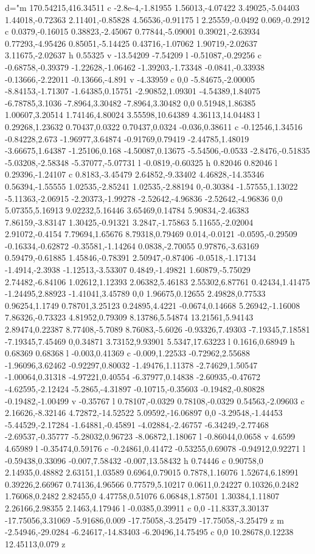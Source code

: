                 d="m 170.54215,416.34511 c -2.8e-4,-1.81955 1.56013,-4.07422 3.49025,-5.04403 1.44018,-0.72363 2.11401,-0.85828 4.56536,-0.91175 l 2.25559,-0.0492 0.069,-0.2912 c 0.0379,-0.16015 0.38823,-2.45067 0.77844,-5.09001 0.39021,-2.63934 0.77293,-4.95426 0.85051,-5.14425 0.43716,-1.07062 1.90719,-2.02637 3.11675,-2.02637 h 0.55325 v -13.54209 -7.54209 l -0.51087,-0.29256 c -0.68758,-0.39379 -1.22628,-1.06462 -1.39203,-1.73348 -0.0841,-0.33938 -0.13666,-2.22011 -0.13666,-4.891 v -4.33959 c 0,0 -5.84675,-2.00005 -8.84153,-1.71307 -1.64385,0.15751 -2.90852,1.09301 -4.54389,1.84075 -6.78785,3.1036 -7.8964,3.30482 -7.8964,3.30482 0,0 0.51948,1.86385 1.00607,3.20514 1.74146,4.80024 3.55598,10.64389 4.36113,14.04483 l 0.29268,1.23632 0.70437,0.0322 0.70437,0.0324 -0.036,0.38611 c -0.12546,1.34516 -0.84228,2.673 -1.96977,3.64874 -0.91769,0.79419 -2.44785,1.48019 -3.66675,1.64387 -1.25106,0.168 -4.50087,0.13675 -5.54506,-0.0533 -2.8476,-0.51835 -5.03208,-2.58348 -5.37077,-5.07731 l -0.0819,-0.60325 h 0.82046 0.82046 l 0.29396,-1.24107 c 0.8183,-3.45479 2.64852,-9.33402 4.46828,-14.35346 0.56394,-1.55555 1.02535,-2.85241 1.02535,-2.88194 0,-0.30384 -1.57555,1.13022 -5.11363,-2.06915 -2.20373,-1.99278 -2.52642,-4.96836 -2.52642,-4.96836 0,0 5.07355,5.16913 9.02232,5.16446 3.65469,0.14784 5.90834,-2.46383 7.86159,-3.83147 1.30425,-0.91321 3.2847,-1.75863 5.11655,-2.02004 2.91072,-0.4154 7.79694,1.65676 8.79318,0.79469 0.014,-0.0121 -0.0595,-0.29509 -0.16334,-0.62872 -0.35581,-1.14264 0.0838,-2.70055 0.97876,-3.63169 0.59479,-0.61885 1.45846,-0.78391 2.50947,-0.87406 -0.0518,-1.17134 -1.4914,-2.3938 -1.12513,-3.53307 0.4849,-1.49821 1.60879,-5.75029 2.74482,-6.84106 1.02612,1.12393 2.06382,5.46183 2.55302,6.87761 0.42434,1.41475 -1.24495,2.88923 -1.41041,3.45789 0,0 1.96675,0.12655 2.49828,0.77533 0.96254,1.1749 0.78701,3.25123 0.24895,4.4221 -0.0674,0.14668 5.26942,-1.16008 7.86326,-0.73323 4.81952,0.79309 8.13786,5.54874 13.21561,5.94143 2.89474,0.22387 8.77408,-5.7089 8.76083,-5.6026 -0.93326,7.49303 -7.19345,7.18581 -7.19345,7.45469 0,0.34871 3.73152,9.93901 5.5347,17.63223 l 0.1616,0.68949 h 0.68369 0.68368 l -0.003,0.41369 c -0.009,1.22533 -0.72962,2.55688 -1.96096,3.62462 -0.92297,0.80032 -1.49476,1.11378 -2.74629,1.50547 -1.00064,0.31318 -4.97221,0.40554 -6.37977,0.14838 -2.60935,-0.47672 -4.62595,-2.12424 -5.2865,-4.31897 -0.10715,-0.35603 -0.19482,-0.80828 -0.19482,-1.00499 v -0.35767 l 0.78107,-0.0329 0.78108,-0.0329 0.54563,-2.09603 c 2.16626,-8.32146 4.72872,-14.52522 5.09592,-16.06897 0,0 -3.29548,-1.44453 -5.44529,-2.17284 -1.64881,-0.45891 -4.02884,-2.46757 -6.34249,-2.77468 -2.69537,-0.35777 -5.28032,0.96723 -8.06872,1.18067 l -0.86044,0.0658 v 4.6599 4.65989 l -0.35474,0.59176 c -0.24861,0.41472 -0.53255,0.69078 -0.94912,0.92271 l -0.59438,0.33096 -0.007,7.58432 -0.007,13.58432 h 0.74446 c 0.90758,0 2.14935,0.48882 2.63151,1.03589 0.6964,0.79015 0.7878,1.16076 1.52674,6.18991 0.39226,2.66967 0.74136,4.96566 0.77579,5.10217 0.0611,0.24227 0.10326,0.2482 1.76068,0.2482 2.82455,0 4.47758,0.51076 6.06848,1.87501 1.30384,1.11807 2.26166,2.98355 2.1463,4.17946 l -0.0385,0.39911 c 0,0 -11.8337,3.30137 -17.75056,3.31069 -5.91686,0.009 -17.75058,-3.25479 -17.75058,-3.25479 z m -2.54946,-29.0284 -6.24617,-14.83403 -6.20496,14.75495 c 0,0 10.28678,0.12238 12.45113,0.079 z 